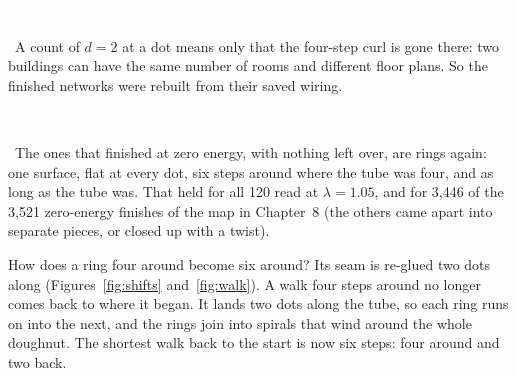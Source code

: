 \documentclass[11pt,letterpaper]{article}
\newcommand{\sub}[1]{\par\medskip{\color{ink}\large\bfseries #1}\par}
\newcommand{\tagbox}[2]{{\sffamily\scriptsize\colorbox{#1}{\textcolor{white}{\strut #2}}}}
\newcommand{\Exact}{\tagbox{kExact}{EXACT}}
\newcommand{\MeasX}{\tagbox{kMeas}{MEASURED, EXPLORATORY}}
\begin{document}
\sub{What the tube turns into}
\Exact\ A count of $d=2$ at a dot means only that the four-step curl is gone there: two buildings can
have the same number of rooms and different floor plans. So the finished networks were rebuilt from
their saved wiring. \MeasX\ The ones that finished at zero energy, with nothing left over, are rings
again: one surface, flat at every dot, six steps around where the tube was four, and as long as the
tube was. That held for all 120 read at $\lambda = 1.05$, and for 3,446 of the 3,521 zero-energy
finishes of the map in Chapter~8 (the others came apart into separate pieces, or closed up with a
twist).

How does a ring four around become six around? Its seam is re-glued two dots along
(Figures~\ref{fig:shifts} and~\ref{fig:walk}). A walk four steps around no longer comes back to where it began. It lands
two dots along the tube, so each ring runs on into the next, and the rings join into spirals that wind
around the whole doughnut. The shortest walk back to the start is now six steps: four around and two
back.
\end{document}
